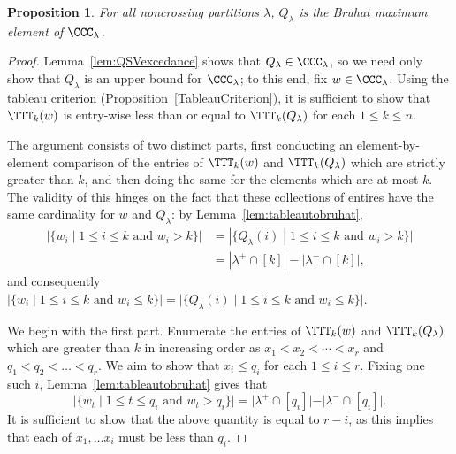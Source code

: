 \documentclass[12pt]{amsart}
\newtheorem{prop}[equation]{Proposition}
\theoremstyle{definition}
\theoremstyle{remark}
\numberwithin{equation}{section}
\begin{document}
\begin{prop}
\label{prop:QSVinterval}
For all noncrossing partitions $\lambda$, $Q_{\lambda}$ is the Bruhat maximum element of $\CCC_{\lambda}$.  
\end{prop}
\begin{proof}
Lemma~\ref{lem:QSVexcedance} shows that $Q_{\lambda} \in \CCC_{\lambda}$, so we need only show that $Q_{\lambda}$ is an upper bound for $\CCC_{\lambda}$; to this end, fix $w \in \CCC_{\lambda}$.  Using the tableau criterion (Proposition~\ref{TableauCriterion}), it is sufficient to show that $\TTT_{k}(w)$ is entry-wise less than or equal to $\TTT_{k}(Q_{\lambda})$ for each $1 \le k \le n$.

The argument consists of two distinct parts, first conducting an element-by-element comparison of the entries of $\TTT_{k}(w)$ and $\TTT_{k}(Q_{\lambda})$ which are strictly greater than $k$, and then doing the same for the elements which are at most $k$.  The validity of this hinges on the fact that these collections of entires have the same cardinality for $w$ and $Q_{\lambda}$: by Lemma~\ref{lem:tableautobruhat}, 
\begin{align*}
|\{ w_{i} \;|\; \text{$1 \le i \le k$ and $w_{i} > k$}\}|
&= |\{ Q_{\lambda}(i) \;|\; \text{$1 \le i \le k$ and $w_{i} > k$}\}| \\
&= |\lambda^{+} \cap [k]| - |\lambda^{-} \cap [k] |,
\end{align*}
and consequently $|\{ w_{i} \;|\; \text{$1 \le i \le k$ and $w_{i} \le k$}\}| = |\{ Q_{\lambda}(i) \;|\; \text{$1 \le i \le k$ and $w_{i} \le k$}\}|$.

We begin with the first part.  Enumerate the entries of $\TTT_{k}(w)$ and $\TTT_{k}(Q_{\lambda})$ which are greater than $k$ in increasing order as $x_{1} < x_{2} < \cdots <  x_{r}$ and $q_{1} < q_{2} < \ldots < q_{r}$.  We aim to show that $x_{i} \le q_{i}$ for each $1 \le i \le r$.  
Fixing one such $i$, Lemma~\ref{lem:tableautobruhat} gives that
\[
|\{ w_{t} \;|\; \text{$1 \le t \le q_{i}$ and $w_{t} > q_{i}$} \}| = |\lambda^{+} \cap [q_{i}]| - |\lambda^{-} \cap [q_{i}]|.
\]
It is sufficient to show that the above quantity is equal to $r - i$, as this implies that each of $x_{1}, \ldots x_{i}$ must be less than $q_{i}$.


\end{proof}
\end{document}
